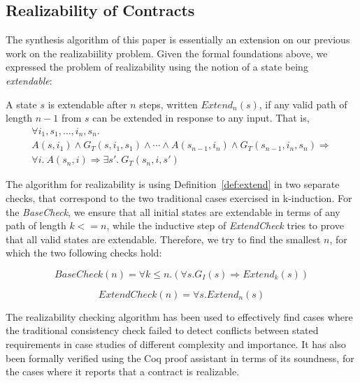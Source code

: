 \subsection{Realizability of Contracts}
The synthesis algorithm of this paper is essentially an extension on our
previous work on the realizabiility problem. Given the formal foundations above,
we expressed the problem of realizability using the notion of a state being
\textit{extendable}:

\begin{definition}
\label{def:extend}
A state $s$ is extendable after $n$ steps, written $Extend_{n}(s)$, if
any valid path of length $n-1$ from $s$ can be extended in response to
any input. That is,
\begin{multline*}
\forall i_1, s_1, \ldots, i_n, s_n.\\ A(s, i_1) \land G_T(s, i_1, s_1)
\land \cdots \land
A(s_{n-1}, i_n) \land G_T(s_{n-1}, i_n, s_n)
\Rightarrow \\
\forall i.~ A(s_n, i) \Rightarrow \exists s'.~ G_T(s_n, i, s')
\end{multline*}
\end{definition}

The algorithm for realizability is using Definition~\ref{def:extend} in two
separate checks, that correspond to the two traditional cases exercised in
k-induction. For the \textit{BaseCheck}, we ensure that all initial states are
extendable in terms of any path of length $k<=n$, while the inductive step of
\textit{ExtendCheck} tries to prove that all valid states are extendable.
Therefore, we try to find the smallest $n$, for which the two following checks
hold:

\begin{equation}
\label{eq:sbcheck}
BaseCheck(n) = \forall k \leq n. (\forall s. G_I(s)
	  	\Rightarrow Extend_k(s))
\end{equation}

\begin{equation}
\label{eq:echeck}
ExtendCheck(n) = \forall s. Extend_n(s)
\end{equation}

The realizability checking algorithm has been used to effectively find cases
where the traditional consistency check failed to detect conflicts between
stated requirements in case studies of different complexity and importance. It
has also been formally verified using the Coq proof assistant in terms of its
soundness, for the cases where it reports that a contract is realizable.

